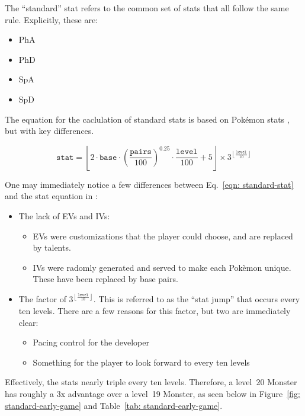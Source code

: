 
The ``standard'' stat refers to the common set of stats that all follow the same rule. Explicitly, these are: 

\begin{itemize}
	\item{PhA}
	\item{PhD}
	\item{SpA}
	\item{SpD}
\end{itemize}

The equation for the caclulation of standard stats is based on Pok\'{e}mon stats \cite{pkmn-stats}, but with key differences.

\begin{equation}\label{eqn: standard-stat}
	\texttt{stat} = \left\lfloor 2\cdot\texttt{base}\cdot\left(\frac{\texttt{pairs}}{100}\right)^{0.25} \cdot\frac{\texttt{level}}{100} + 5 \right\rfloor \times 3^{\left\lfloor\frac{\texttt{level}}{10}\right\rfloor}
\end{equation}

\noindent One may immediately notice a few differences between Eq.~\eqref{eqn: standard-stat} and the stat equation in \cite{pkmn-stats}:

	\begin{itemize}
		\item{The lack of EVs and IVs:
			\begin{itemize}
				\item{EVs were customizations that the player could choose, and are replaced by talents.}
				\item{IVs were radomly generated and served to make each Pok\`{e}mon unique. These have been replaced by base pairs.}
			\end{itemize}
		}
		\item{The factor of $3^{\left\lfloor\frac{\texttt{level}}{10}\right\rfloor}$. This is referred to as the ``stat jump'' that occurs every ten levels. There are a few reasons for this factor, but two are immediately clear:
		\begin{itemize}
			\item{Pacing control for the developer}
			\item{Something for the player to look forward to every ten levels}
		\end{itemize}
		}
	\end{itemize}
	
Effectively, the stats nearly triple every ten levels. Therefore, a level~20 Monster has roughly a 3x advantage over a level~19 Monster, as seen below in Figure~\ref{fig: standard-early-game} and Table~\ref{tab: standard-early-game}. 

